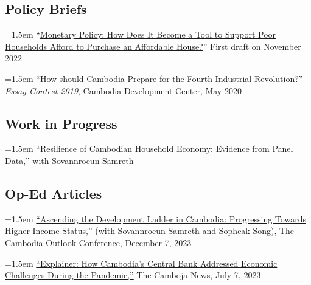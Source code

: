 \documentclass[10pt,a4paper]{article}
\begin{document}
\subsection*{Policy Briefs}
	
		\hangindent=1.5em
		“\href{}{Monetary Policy: How Does It Become a Tool to Support Poor Households Afford to Purchase an Affordable House?}” First draft on November 2022 \\ \vspace{-.5em}
	
		\hangindent=1.5em
		\href{https://cd-center.org/en/essay-contest-2019-first-place-winner/}{``How should Cambodia Prepare for the Fourth Industrial Revolution?''} \textit{Essay Contest 2019}, Cambodia Development Center, May 2020

\subsection*{Work in Progress}
	\hangindent=1.5em
	``Resilience of Cambodian Household Economy: Evidence from Panel Data,'' with Sovannroeun Samreth

\subsection*{Op-Ed Articles}

	\hangindent=1.5em
	\href{https://coc2023.cdri.org.kh/ascending-the-development-ladder-in-cambodia-progressing-towards-higher-income-status/}{``Ascending the Development Ladder in Cambodia: Progressing Towards Higher Income Status,''} (with Sovannroeun Samreth and Sopheak Song), The Cambodia Outlook Conference, December 7, 2023\\ \vspace{-.5em}
	
	\hangindent=1.5em
	\href{https://cambojanews.com/explainer-how-cambodias-central-bank-addressed-economic-challenges-during-the-pandemic/}{``Explainer: How Cambodia's Central Bank Addressed Economic Challenges During the Pandemic,''} The Camboja News, July 7, 2023\\ \vspace{-.5em}
	
\end{document}
